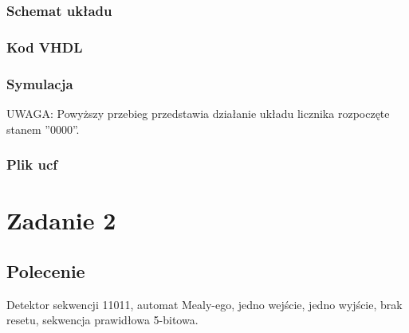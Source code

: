 \documentclass[a4paper,12pt]{extarticle}  %
\begin{document}
\subsubsection{Schemat układu}
\begin{figure}[H]
	\centering
\end{figure}
\subsubsection{Kod VHDL}

\subsubsection{Symulacja}
\begin{figure}[H]
	\centering
\end{figure}
UWAGA: Powyższy przebieg przedstawia działanie układu licznika rozpoczęte stanem ''0000''.
\subsubsection{Plik ucf}

\section{Zadanie 2}
\subsection{Polecenie}
Detektor sekwencji 11011, automat Mealy-ego, jedno wejście, jedno wyjście, brak resetu, sekwencja prawidłowa 5-bitowa.
\end{document}
